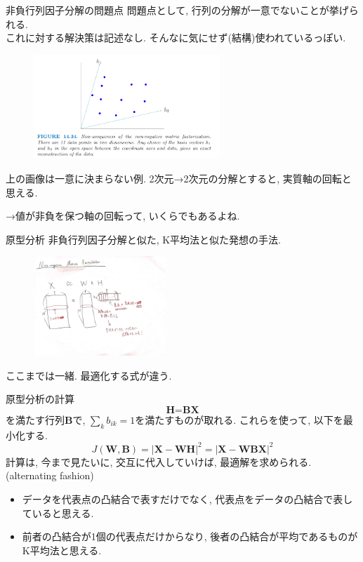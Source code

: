 \documentclass[dvipdfmx,8pt]{beamer}
\begin{document}
  \begin{frame}{非負行列因子分解の問題点}
    問題点として, 行列の分解が一意でないことが挙げられる. \\
    これに対する解決策は記述なし.
    そんなに気にせず(結構)使われているっぽい.
    \begin{figure}[htb]
      \centering
      \includegraphics[width=7cm,clip]{images/nnmf-nonuniqueness.png}
    \end{figure}
    上の画像は一意に決まらない例.
    2次元→2次元の分解とすると, 実質軸の回転と思える.

    →値が非負を保つ軸の回転って, いくらでもあるよね.
  \end{frame}
  \begin{frame}{原型分析}
    非負行列因子分解と似た, K平均法と似た発想の手法. \\
    \begin{figure}[htb]
      \centering
      \includegraphics[width=5cm,clip]{images/nmf-overview.jpg}
    \end{figure}
    ここまでは一緒. 最適化する式が違う.
  \end{frame}
  \begin{frame}{原型分析の計算}
    \[
      \textbf{H}=\textbf{BX}
    \]
    を満たす行列$\textbf{B}$で, $\sum_k{b_{ik}}=1$を満たすものが取れる.
    これらを使って, 以下を最小化する.
    \[
      J(\textbf{W},\textbf{B})=|\textbf{X}-\textbf{WH}|^2=|\textbf{X}-\textbf{WBX}|^2
    \]
    計算は, 今まで見たいに, 交互に代入していけば, 最適解を求められる. (alternating fashion)
    \begin{itemize}
      \item データを代表点の凸結合で表すだけでなく, 代表点をデータの凸結合で表していると思える.
      \item 前者の凸結合が1個の代表点だけからなり, 後者の凸結合が平均であるものがK平均法と思える.
    \end{itemize}
  \end{frame}
\end{document}
